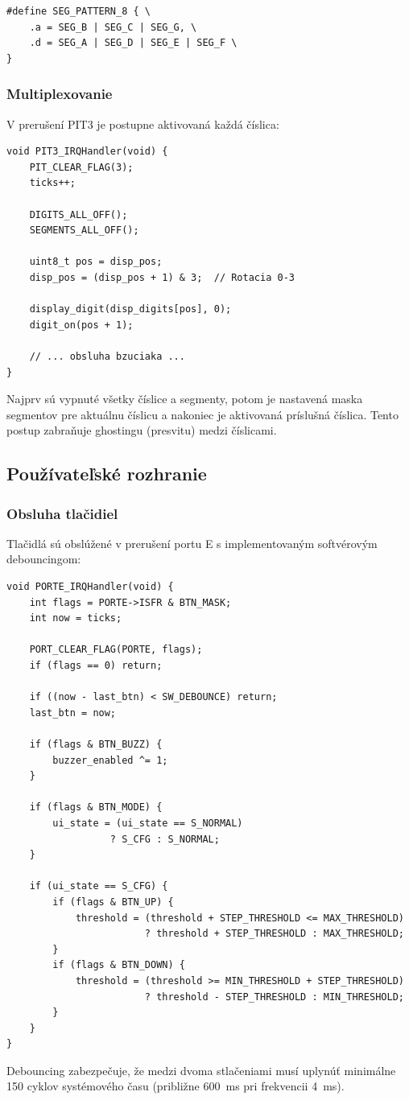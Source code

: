 \documentclass[11pt, a4paper,slovak]{article}
\begin{document}
\begin{lstlisting}
#define SEG_PATTERN_8 { \
    .a = SEG_B | SEG_C | SEG_G, \
    .d = SEG_A | SEG_D | SEG_E | SEG_F \
}
\end{lstlisting}

\subsubsection{Multiplexovanie}

V prerušení PIT3 je postupne aktivovaná každá číslica:

\begin{lstlisting}
void PIT3_IRQHandler(void) {
    PIT_CLEAR_FLAG(3);
    ticks++;

    DIGITS_ALL_OFF();
    SEGMENTS_ALL_OFF();

    uint8_t pos = disp_pos;
    disp_pos = (disp_pos + 1) & 3;  // Rotacia 0-3

    display_digit(disp_digits[pos], 0);
    digit_on(pos + 1);
    
    // ... obsluha bzuciaka ...
}
\end{lstlisting}
Najprv sú vypnuté všetky číslice a segmenty, potom je nastavená maska segmentov pre aktuálnu číslicu a nakoniec je aktivovaná príslušná číslica. Tento postup zabraňuje ghostingu (presvitu) medzi číslicami.

\subsection{Používateľské rozhranie}

\subsubsection{Obsluha tlačidiel}

Tlačidlá sú obslúžené v prerušení portu E s implementovaným softvérovým debouncingom:

\begin{lstlisting}
void PORTE_IRQHandler(void) {
    int flags = PORTE->ISFR & BTN_MASK;
    int now = ticks;

    PORT_CLEAR_FLAG(PORTE, flags);
    if (flags == 0) return;

    if ((now - last_btn) < SW_DEBOUNCE) return;
    last_btn = now;

    if (flags & BTN_BUZZ) {
        buzzer_enabled ^= 1;
    }

    if (flags & BTN_MODE) {
        ui_state = (ui_state == S_NORMAL) 
                  ? S_CFG : S_NORMAL;
    }

    if (ui_state == S_CFG) {
        if (flags & BTN_UP) {
            threshold = (threshold + STEP_THRESHOLD <= MAX_THRESHOLD)
                        ? threshold + STEP_THRESHOLD : MAX_THRESHOLD;
        }
        if (flags & BTN_DOWN) {
            threshold = (threshold >= MIN_THRESHOLD + STEP_THRESHOLD)
                        ? threshold - STEP_THRESHOLD : MIN_THRESHOLD;
        }
    }
}
\end{lstlisting}
Debouncing zabezpečuje, že medzi dvoma stlačeniami musí uplynúť minimálne 150 cyklov systémového času (približne 600~ms pri frekvencii 4~ms).
\end{document}
